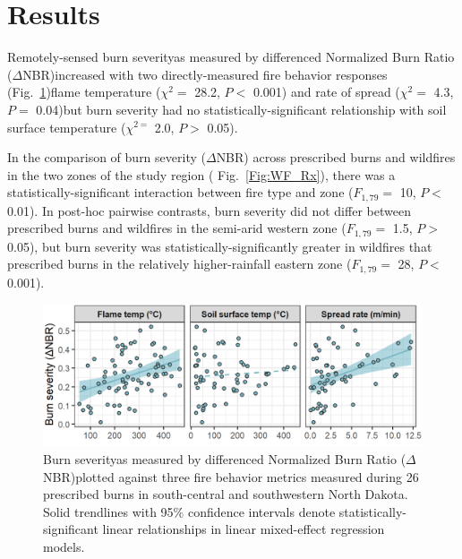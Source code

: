 \documentclass[fire,article,submit,oneauthor,pdftex]{Definitions/mdpi}
\begin{document}
\section{Results} 

Remotely-sensed burn severity\textemdash as measured by differenced Normalized Burn Ratio ($\Delta$NBR)\textemdash increased with two directly-measured fire behavior responses (Fig.~\ref{Fig:SevBehav})\textemdash flame temperature ($\chi^{2}=$ 28.2, $P<$ 0.001) and rate of spread ($\chi^{2}=$ 4.3, $P=$ 0.04)\textemdash but burn severity had no statistically-significant relationship with soil surface temperature ($\chi^{2=}$ 2.0, $P>$  0.05). 


In the comparison of burn severity ($\Delta$NBR) across prescribed burns and wildfires in the two zones of the study region ( Fig.~\ref{Fig:WF_Rx}), there was a statistically-significant interaction between fire type and zone ($F_{1,79}=$ 10, $P<$ 0.01). 
In post-hoc pairwise contrasts, burn severity did not differ between prescribed burns and wildfires in the semi-arid western zone ($F_{1,79}=$ 1.5, $P>$ 0.05), but burn severity was statistically-significantly greater in wildfires that prescribed burns in the relatively higher-rainfall eastern zone ($F_{1,79}=$ 28, $P<$ 0.001). 

\begin{figure}[t]
	\centering
	\includegraphics[width=1\columnwidth]{dNBR_v_FB-1.png}
	\caption{Burn severity\textemdash as measured by differenced Normalized Burn Ratio ($\Delta$NBR)\textemdash plotted against three fire behavior metrics measured during 26 prescribed burns in south-central and southwestern North Dakota.
	Solid trendlines with 95\% confidence intervals denote statistically-significant linear relationships in linear mixed-effect regression models.   }
	\label{Fig:SevBehav} %
\end{figure}
\end{document}
